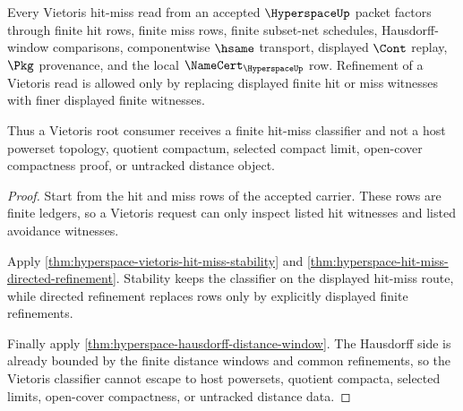 \begin{theorem}
\label{thm:hyperspace-vietoris-root-unblock-obligations}
Every Vietoris hit-miss read from an accepted $\HyperspaceUp$ packet factors through finite hit rows, finite miss rows, finite subset-net schedules, Hausdorff-window comparisons, componentwise $\hsame$ transport, displayed $\Cont$ replay, $\Pkg$ provenance, and the local $\NameCert_{\HyperspaceUp}$ row. Refinement of a Vietoris read is allowed only by replacing displayed finite hit or miss witnesses with finer displayed finite witnesses.

Thus a Vietoris root consumer receives a finite hit-miss classifier and not a host powerset topology, quotient compactum, selected compact limit, open-cover compactness proof, or untracked distance object.
\end{theorem}
\begin{proof}
Start from the hit and miss rows of the accepted carrier. These rows are finite ledgers, so a Vietoris request can only inspect listed hit witnesses and listed avoidance witnesses.

Apply \autoref{thm:hyperspace-vietoris-hit-miss-stability} and \autoref{thm:hyperspace-hit-miss-directed-refinement}. Stability keeps the classifier on the displayed hit-miss route, while directed refinement replaces rows only by explicitly displayed finite refinements.

Finally apply \autoref{thm:hyperspace-hausdorff-distance-window}. The Hausdorff side is already bounded by the finite distance windows and common refinements, so the Vietoris classifier cannot escape to host powersets, quotient compacta, selected limits, open-cover compactness, or untracked distance data.
\end{proof}

